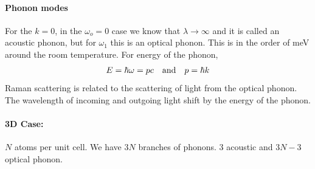\documentclass[../main.tex]{subfiles}
\begin{document}
\paragraph{Phonon modes} For the $k=0$, in the $\omega_o = 0$ case we know that
$\lambda \to \infty$ and it is called an acoustic phonon, but for $\omega_1$ this is an optical 
phonon. This is in the order of meV around the room temperature. For energy of the phonon,
\begin{align*}
    E = \hbar \omega = pc \qand p = \hbar k
\end{align*}
Raman scattering is related to the scattering of light from the optical phonon. The wavelength of
incoming and outgoing light shift by the energy of the phonon.

\paragraph{3D Case:} $N$ atoms per unit cell. We have $3N$ branches of phonons. 3 acoustic and
$3N - 3$ optical phonon.
\end{document}

